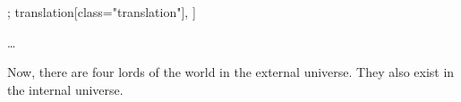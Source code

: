 \begin{alignment}[
  texts=edition[class="edition"];
  translation[class="translation"],
  ]
\begin{edition}
\begin{prose}[p35_01]
{  }\dd{}
\dd{}\begin{otherlanguage}{english} \ldots \sic*{} \end{otherlanguage}
    \end{prose}
  \end{edition}
  \begin{translation}
\begin{tlate}[p35_01]
      \noindent
     Now, there are four lords of the world in the external universe. They also exist in the internal universe.


\end{tlate}
\end{translation}
\end{alignment}
